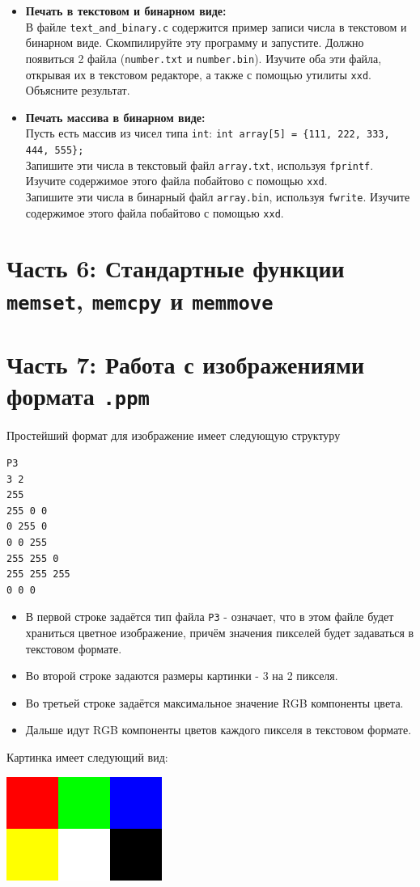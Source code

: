 \documentclass{article}
\begin{document}
\begin{itemize}
\item \textbf{Печать в текстовом и бинарном виде:}\\
В файле \texttt{text\_and\_binary.c} содержится пример записи числа в текстовом и бинарном виде. Скомпилируйте эту программу и запустите. Должно появиться 2 файла (\texttt{number.txt} и \texttt{number.bin}). Изучите оба эти файла, открывая их в текстовом редакторе, а также с помощью утилиты \texttt{xxd}. Объясните результат.


\item \textbf{Печать массива в бинарном виде:}\\
Пусть есть массив из чисел типа \texttt{int}: \texttt{int array[5] = \{111, 222, 333, 444, 555\};}\\
Запишите эти числа в текстовый файл \texttt{array.txt}, используя \texttt{fprintf}. Изучите содержимое этого файла побайтово с помощью \texttt{xxd}.\\
Запишите эти числа в бинарный файл \texttt{array.bin}, используя \texttt{fwrite}. Изучите содержимое этого файла побайтово с помощью \texttt{xxd}.
\end{itemize}





\section*{Часть 6: Стандартные функции \texttt{memset}, \texttt{memcpy} и \texttt{memmove}}


\newpage
\section*{Часть 7: Работа с изображениями формата \texttt{.ppm}}
Простейший формат для изображение имеет следующую структуру
\begin{verbatim}
P3
3 2
255
255 0 0 
0 255 0  
0 0 255 
255 255 0 
255 255 255 
0 0 0
\end{verbatim}
\begin{itemize}
\item В первой строке задаётся тип файла \texttt{P3} - означает, что в этом файле будет храниться цветное изображение, причём значения пикселей будет задаваться в текстовом формате.
\item Во второй строке задаются размеры картинки - 3 на 2 пикселя.
\item Во третьей строке задаётся максимальное значение RGB компоненты цвета.
\item Дальше идут RGB компоненты цветов каждого пикселя в текстовом формате.
\end{itemize}
Картинка имеет следующий вид:
\begin{center}
\includegraphics[scale=0.5]{../images/tiny.png}
\end{center}
\end{document}
